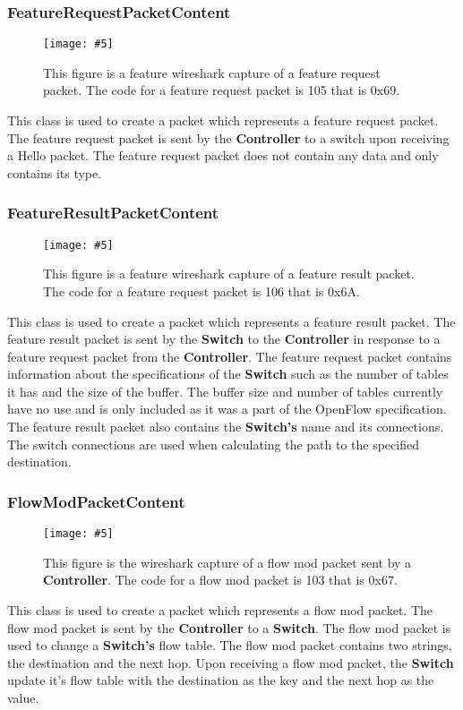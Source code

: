 \documentclass{article}
\newcommand{\includescalefigure}[5]{
  \begin{figure}[H]
    \centering
    \texttt{[image: \#5]}
    \captionsetup{width=.8\linewidth}
    \caption[#2]{#3}
    \label{#1}
  \end{figure}
}
\begin{document}
\subsubsection{FeatureRequestPacketContent}
\includescalefigure{featurerequest}{featurerequest}{This figure is a feature
wireshark capture of a feature request packet. The code for a feature request
packet is 105 that is 0x69.}{1}{FeatureRequestPacket.png}

This class is used to create a packet which represents a feature request
packet. The feature request packet is sent by the \textbf{Controller} to a
switch upon receiving a Hello packet. The feature request packet does not
contain any data and only contains its type.

\subsubsection{FeatureResultPacketContent}
\includescalefigure{featureresult}{featureresult}{This figure is a feature
wireshark capture of a feature result packet. The code for a feature request
packet is 106 that is 0x6A.}{1}{FeatureResultPacket.png}

This class is used to create a packet which represents a feature result packet.
The feature result packet is sent by the \textbf{Switch} to the
\textbf{Controller} in response to a feature request packet from the
\textbf{Controller}. The feature request packet contains information about the
specifications of the \textbf{Switch} such as the number of tables it has and
the size of the buffer. The buffer size and number of tables currently have no
use and is only included as it was a part of the OpenFlow specification. The
feature result packet also contains the \textbf{Switch's} name and its
connections. The switch connections are used when calculating the path to the
specified destination.

\subsubsection{FlowModPacketContent}
\includescalefigure{flowmodpacket}{flowmodpacket}{This figure is the wireshark
capture of a flow mod packet sent by a \textbf{Controller}. The code for a
flow mod packet is 103 that is 0x67.}{1}{FlowModPacket.png}

This class is used to create a packet which represents a flow mod packet. The
flow mod packet is sent by the \textbf{Controller} to a \textbf{Switch}. The
flow mod packet is used to change a \textbf{Switch's} flow table. The flow mod
packet contains two strings, the destination and the next hop. Upon receiving a
flow mod packet, the \textbf{Switch} update it's flow table with the destination
as the key and the next hop as the value.
\end{document}
